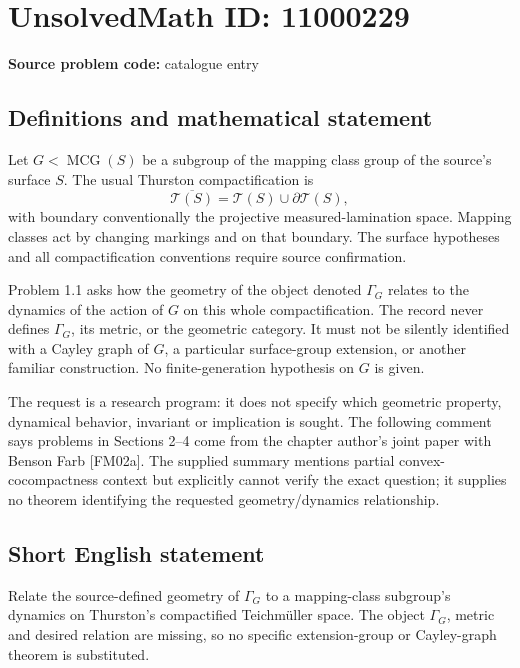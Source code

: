 \documentclass[11pt]{article}
\begin{document}
\section*{UnsolvedMath ID: 11000229}
\textbf{Source problem code:} catalogue entry
\subsection{Definitions and mathematical statement}
Let \(G<\operatorname{MCG}(S)\) be a subgroup of the mapping class group of the source's surface \(S\). The usual Thurston compactification is
\[
 \overline{\mathcal T(S)}=\mathcal T(S)\cup\partial\mathcal T(S),
\]
with boundary conventionally the projective measured-lamination space. Mapping classes act by changing markings and on that boundary. The surface hypotheses and all compactification conventions require source confirmation.

Problem 1.1 asks how the geometry of the object denoted \(\Gamma_G\) relates to the dynamics of the action of \(G\) on this whole compactification. The record never defines \(\Gamma_G\), its metric, or the geometric category. It must not be silently identified with a Cayley graph of \(G\), a particular surface-group extension, or another familiar construction. No finite-generation hypothesis on \(G\) is given.

The request is a research program: it does not specify which geometric property, dynamical behavior, invariant or implication is sought. The following comment says problems in Sections 2--4 come from the chapter author's joint paper with Benson Farb [FM02a]. The supplied summary mentions partial convex-cocompactness context but explicitly cannot verify the exact question; it supplies no theorem identifying the requested geometry/dynamics relationship.
\subsection{Short English statement}
Relate the source-defined geometry of \(\Gamma_G\) to a mapping-class subgroup's dynamics on Thurston's compactified Teichmüller space. The object \(\Gamma_G\), metric and desired relation are missing, so no specific extension-group or Cayley-graph theorem is substituted.
\end{document}
